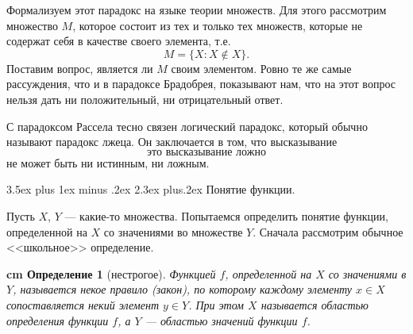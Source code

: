 \documentclass[12pt, russian]{article}
\makeatletter
\renewcommand\subsection{\@startsection {subsection}{2}{\parindent}%
{3.5ex plus 1ex minus .2ex}%
{2.3ex plus.2ex}%
{\normalfont\large\bfseries}}
\newtheorem{definition}{\hskip 0.5 cm Определение}%
\makeatother
\begin{document}
Формализуем этот парадокс на языке теории множеств. Для этого рассмотрим множество $M$, которое состоит из тех и только тех множеств, которые не содержат себя в качестве своего элемента, т.е.
\begin{equation}\label{eqRusselParadox}
	M = \{ X: X \notin X\}.
\end{equation}
Поставим вопрос, является ли $M$ своим элементом. Ровно те же самые рассуждения, что и в парадоксе Брадобрея, показывают нам, что на этот вопрос нельзя дать ни положительный, ни отрицательный ответ.

С  парадоксом Рассела тесно связен логический парадокс, который обычно называют парадокс лжеца. Он заключается в том, что высказывание
$$
\text{это высказывание ложно}
$$
не может быть ни истинным, ни ложным.


\subsection{Понятие функции.}

Пусть $X$, $Y$ --- какие-то множества. Попытаемся определить понятие функции, определенной на $X$ со значениями во множестве $Y$. Сначала рассмотрим обычное <<школьное>> определение.

\begin{definition}[нестрогое]
	Функцией $f$, определенной на $X$ со значениями в $Y$, называется некое \textit{правило} (закон), по которому каждому элементу $x \in X$ сопоставляется некий элемент $y \in Y$. При этом $X$ называется областью определения функции $f$, а $Y$ --- областью значений функции $f$.
\end{definition}




\newpage
\begin{thebibliography}{99}


\end{thebibliography}

\end{document}
